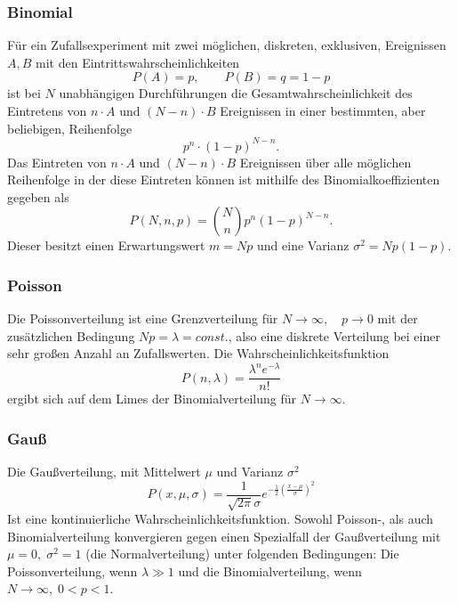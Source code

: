 \documentclass{article}
\begin{document}
	\subsubsection{Binomial}
	Für ein Zufallsexperiment mit zwei möglichen, diskreten, exklusiven, Ereignissen $A,B$ mit den Eintrittswahrscheinlichkeiten 
	\begin{equation}
	P(A)=p,\qquad P(B)=q=1-p
	\end{equation}
	ist bei $N$ unabhängigen Durchführungen die Gesamtwahrscheinlichkeit des Eintretens von $n\cdot A$ und $(N-n)\cdot B$ Ereignissen in einer bestimmten, aber beliebigen, Reihenfolge 
	\begin{equation}
	p^n\cdot(1-p)^{N-n}.
	\end{equation}
	Das Eintreten von $n\cdot A$ und $(N-n)\cdot B$ Ereignissen über alle möglichen Reihenfolge in der diese Eintreten können ist mithilfe des Binomialkoeffizienten gegeben als
	\begin{equation}
	P(N,n,p)=\binom{N}{n}p^n(1-p)^{N-n}.
	\end{equation}
	Dieser besitzt einen Erwartungswert $m=Np$ und eine Varianz $\sigma^2=Np(1-p)$.
	\subsubsection{Poisson}
	Die Poissonverteilung ist eine Grenzverteilung für $N \rightarrow\infty,\quad p\rightarrow0$ mit der zusätzlichen Bedingung $Np=\lambda=const.$, also eine diskrete Verteilung bei einer sehr großen Anzahl an Zufallswerten. Die Wahrscheinlichkeitsfunktion
	\begin{equation}
	P(n,\lambda)=\frac{\lambda^n e^{-\lambda}}{n!}
	\end{equation}
	ergibt sich auf dem Limes der Binomialverteilung für $N\rightarrow\infty$.
	\subsubsection{Gauß}
	Die Gaußverteilung, mit Mittelwert $\mu$ und Varianz $\sigma^2$ 
	\begin{equation}
	P(x,\mu,\sigma)=\frac{1}{\sqrt{2\pi}\sigma}e^{-\frac{1}{2}\left(\frac{x-\mu}{\sigma}\right)^2}
	\end{equation}
	Ist eine kontinuierliche Wahrscheinlichkeitsfunktion. Sowohl Poisson-, als auch Binomialverteilung konvergieren gegen einen Spezialfall der Gaußverteilung mit $\mu=0,\;\sigma^2=1$ (die Normalverteilung) unter folgenden Bedingungen: Die Poissonverteilung, wenn $\lambda\gg1$ und die Binomialverteilung, wenn $N\rightarrow\infty,\;0<p<1$.
\end{document}
